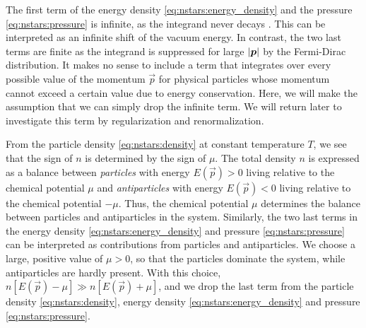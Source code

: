 The first term of the energy density \eqref{eq:nstars:energy_density} and the pressure \eqref{eq:nstars:pressure} is infinite, as the integrand never decays .
This can be interpreted as an infinite shift of the vacuum energy.
In contrast, the two last terms are finite as the integrand is suppressed  for large $\left\lvert {\bm{p}} \right\rvert$ by the Fermi-Dirac distribution.
It makes no sense to include a term that integrates over every possible value of the momentum $\vec{p}$ for physical particles whose momentum cannot exceed a certain value due to energy conservation.
Here, we will make the assumption that we can simply drop the infinite term.
We will return later to investigate this term by regularization and renormalization.  

From the particle density \eqref{eq:nstars:density} at constant temperature $T$, we see that the sign of $n$ is determined by the sign of $\mu$.
The total density $n$ is expressed as a balance between \emph{particles} with energy $E(\vec{p}) > 0$ living relative to the chemical potential $\mu$ and \emph{antiparticles} with energy $E(\vec{p}) < 0$ living relative to the chemical potential $-\mu$.
Thus, the chemical potential $\mu$ determines the balance between particles and antiparticles in the system.
Similarly, the two last terms in the energy density \eqref{eq:nstars:energy_density} and pressure \eqref{eq:nstars:pressure} can be interpreted as contributions from particles and antiparticles.
We choose a large, positive value of $\mu > 0$, so that the particles dominate the system, while antiparticles are hardly present.
With this choice, $n \left[ E(\vec{p}) - \mu \right] \gg n \left[ E(\vec{p}) + \mu \right]$, and we drop the last term from the particle density \eqref{eq:nstars:density}, energy density \eqref{eq:nstars:energy_density} and pressure \eqref{eq:nstars:pressure}.

